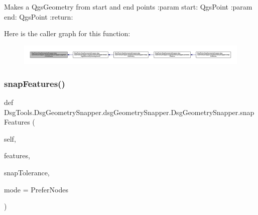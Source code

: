 \begin{DoxyVerb}Makes a QgsGeometry from start and end points
:param start: QgsPoint
:param end: QgsPoint
:return:
\end{DoxyVerb}
 Here is the caller graph for this function\+:
\nopagebreak
\begin{figure}[H]
\begin{center}
\leavevmode
\includegraphics[width=350pt]{class_dsg_tools_1_1_dsg_geometry_snapper_1_1dsg_geometry_snapper_1_1_dsg_geometry_snapper_ad51384d8b24f5564aefc5800505cadaf_icgraph}
\end{center}
\end{figure}
\mbox{\label{class_dsg_tools_1_1_dsg_geometry_snapper_1_1dsg_geometry_snapper_1_1_dsg_geometry_snapper_aaa4a4b66cca80225f32087717f300309}} 
\subsubsection{\texorpdfstring{snap\+Features()}{snapFeatures()}}
{\footnotesize\ttfamily def Dsg\+Tools.\+Dsg\+Geometry\+Snapper.\+dsg\+Geometry\+Snapper.\+Dsg\+Geometry\+Snapper.\+snap\+Features (\begin{DoxyParamCaption}\item[{}]{self,  }\item[{}]{features,  }\item[{}]{snap\+Tolerance,  }\item[{}]{mode = {\ttfamily PreferNodes} }\end{DoxyParamCaption})}

